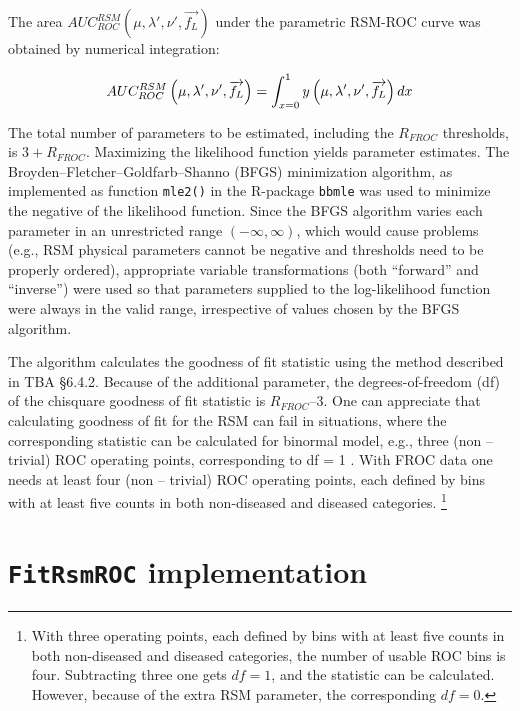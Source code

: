 \documentclass[
]{book}
\begin{document}
The area \(AUC_{ROC}^{RSM}\left ( \mu, \lambda', \nu', \overrightarrow{f_L} \right )\) under the parametric RSM-ROC curve was obtained by numerical integration:

\begin{equation}
AUC_{ROC}^{RSM}\left ( \mu, \lambda', \nu', \overrightarrow{f_L} \right ) = \int_{x=0}^{1} y \left ( \mu, \lambda', \nu', \overrightarrow{f_L} \right ) dx \\
\label{eq:rsm-fitting-roc-auc-integral}
\end{equation}

The total number of parameters to be estimated, including the \(R_{FROC}\) thresholds, is \(3+R_{FROC}\). Maximizing the likelihood function yields parameter estimates. The Broyden--Fletcher--Goldfarb--Shanno (BFGS) \citep{RN2646, RN2647, RN2648, RN2649, RN2651, RN2650} minimization algorithm, as implemented as function \texttt{mle2()} in the R-package \texttt{bbmle} \citep{packageBbmle} was used to minimize the negative of the likelihood function. Since the BFGS algorithm varies each parameter in an unrestricted range \((-\infty, \infty)\), which would cause problems (e.g., RSM physical parameters cannot be negative and thresholds need to be properly ordered), appropriate variable transformations (both ``forward'' and ``inverse'') were used so that parameters supplied to the log-likelihood function were always in the valid range, irrespective of values chosen by the BFGS algorithm.

The algorithm calculates the goodness of fit statistic using the method described in TBA §6.4.2. Because of the additional parameter, the degrees-of-freedom (df) of the chisquare goodness of fit statistic is \(R_{FROC} – 3\). One can appreciate that calculating goodness of fit for the RSM can fail in situations, where the corresponding statistic can be calculated for binormal model, e.g., three (non -- trivial) ROC operating points, corresponding to df = 1 . With FROC data one needs at least four (non -- trivial) ROC operating points, each defined by bins with at least five counts in both non-diseased and diseased categories. \footnote{With three operating points, each defined by bins with at least five counts in both non-diseased and diseased categories, the number of usable ROC bins is four. Subtracting three one gets \(df = 1\), and the statistic can be calculated. However, because of the extra RSM parameter, the corresponding \(df = 0\).}

\hypertarget{rsm-fitting-fitrsmroc-implementation}{%
\section{\texorpdfstring{\texttt{FitRsmROC} implementation}{FitRsmROC implementation}}\label{rsm-fitting-fitrsmroc-implementation}}
\end{document}
